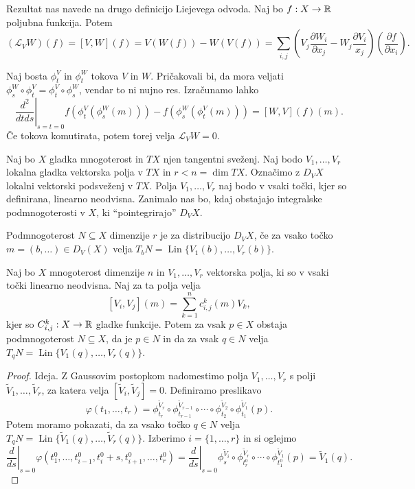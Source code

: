 Rezultat nas navede na drugo definicijo Liejevega odvoda.
Naj bo $f: X \to \mathbb{R}$ poljubna funkcija.
Potem
\[
  (\mathcal{L}_V W) (f) = \left[ V, W \right] (f)
  = V(W(f)) - W(V(f))
  = \sum_{i,j} \left( V_j \frac{\partial W_i}{\partial x_j} - W_j \frac{\partial
	V_i}{x_j} \right) \left( \frac{\partial f}{\partial x_i} \right).
\]

Naj bosta $\phi_t^V$ in $\phi_t^W$ tokova $V$ in $W$.
Pričakovali bi, da mora veljati $\phi_s^W \circ \phi_t^V = \phi_t^V \circ
\phi_s^W$, vendar to ni nujno res.
Izračunamo lahko
\[
  \left. \frac{d^2}{dt ds} \right|_{s=t=0} f(\phi_t^V(\phi_s^W(m))) -
  f(\phi_s^W(\phi_t^V(m)))
  = \left[ W, V \right](f) (m).
\]
Če tokova komutirata, potem torej velja $\mathcal{L}_V W = 0$.


Naj bo $X$ gladka mnogoterost in $TX$ njen tangentni sveženj.
Naj bodo $V_1, \ldots, V_r$ lokalna gladka vektorska polja v $TX$ in $r < n =
\dim TX$.
Označimo z $D_V X$ lokalni vektorski podsveženj v $TX$.
Polja $V_1, \ldots, V_r$ naj bodo v vsaki točki, kjer so definirana, linearno
neodvisna.
Zanimalo nas bo, kdaj obstajajo integralske podmnogoterosti v $X$, ki
\enquote{pointegrirajo} $D_V X$.

\begin{definicija}
  Podmnogoterost $N \subseteq X$ dimenzije $r$ je  za distribucijo $D_V X$, če za vsako točko $m = (b, \ldots)
  \in D_V(X)$ velja $T_b N = \operatorname{Lin} \{ V_1(b), \ldots, V_r(b) \}$.
\end{definicija}

\begin{izrek}[Frobenius]
  Naj bo $X$ mnogoterost dimenzije $n$ in $V_1, \ldots, V_r$ vektorska polja, ki
  so v vsaki točki linearno neodvisna.
  Naj za ta polja velja
  \[
	\left[ V_i, V_j \right](m)
	= \sum_{k=1}^n c_{i,j}^k(m) V_k,
  \]
  kjer so $C_{i,j}^k: X \to \mathbb{R}$ gladke funkcije.
  Potem za vsak $p \in X$ obstaja podmnogoterost $N \subseteq X$, da
  je $p \in N$ in da za vsak $q \in N$ velja $T_q N = \operatorname{Lin}
  \{V_1(q), \ldots, V_r(q)\}$.
\end{izrek}

\begin{proof}
  Ideja.
  Z Gaussovim postopkom nadomestimo polja $V_1, \ldots, V_r$ s polji
  $\tilde{V}_1, \ldots, \tilde{V}_r$, za katera velja $\left[ \tilde{V}_i,
	\tilde{V}_j \right] = 0$.
  Definiramo preslikavo
  \[
	\varphi(t_1, \ldots, t_r)
	= \phi_{t_r}^{\tilde{V}_r} \circ \phi_{t_{r-1}}^{\tilde{V}_{r-1}} \circ \cdots \circ
	\phi_{t_2}^{\tilde{V}_2} \circ \phi_{t_1}^{\tilde{V}_1}(p).
  \]
  Potem moramo pokazati, da za vsako točko $q \in N$ velja $T_q N =
  \operatorname{Lin}\{ \tilde{V}_1(q), \ldots, \tilde{V}_r(q) \}$.
  Izberimo $i = \{1, \ldots, r\}$ in si oglejmo
  \[
	\left. \frac{d}{ds} \right|_{s=0} \varphi(t_1^0, \ldots, t_{i-1}^0, t_i^0 +
	s, t_{i+1}^0, \ldots, t_r^0)
	= \left. \frac{d}{ds} \right|_{s=0} \phi_s^{\tilde{V}_i} \circ
	\phi_{t_r^0}^{\tilde{V}_r} \circ \cdots \circ \phi_{t_1^0}^{\tilde{V}_1}(p)
	= \tilde{V}_1(q).
  \]
\end{proof}

